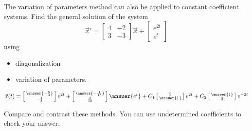 \documentclass{ximera}
\begin{document}
\begin{exercise}
    The variation of parameters method can also be applied to constant coefficient systems. Find the general solution of the system
    \[ {\vec{x}}' = \begin{bmatrix} 4 & -2 \\ 3 & -3 \end{bmatrix} \vec{x} + \begin{bmatrix} e^{2t} \\ e^t \end{bmatrix} \] using 
    \begin{itemize}
        \item diagonalization
        \item variation of parameters.
    \end{itemize}
    $\vec{x}(t) = \left[\begin{smallmatrix} \answer{-\frac{5}{4}} \\ -\frac{4}{3} \end{smallmatrix}\right]e^{2t} + \left[\begin{smallmatrix} \answer{-\frac{1}{15}} \\ \frac{3}{10} \end{smallmatrix}\right]\answer{e^t} + C_1\left[\begin{smallmatrix} 2 \\ \answer{1} \end{smallmatrix}\right]e^{2t} + C_2\left[\begin{smallmatrix} \answer{1} \\ 3 \end{smallmatrix}\right]e^{-2t}$
    \begin{feedback}
        Compare and contrast these methods. You can use undetermined coefficients to check your answer.
    \end{feedback}
\end{exercise}
\end{document}
